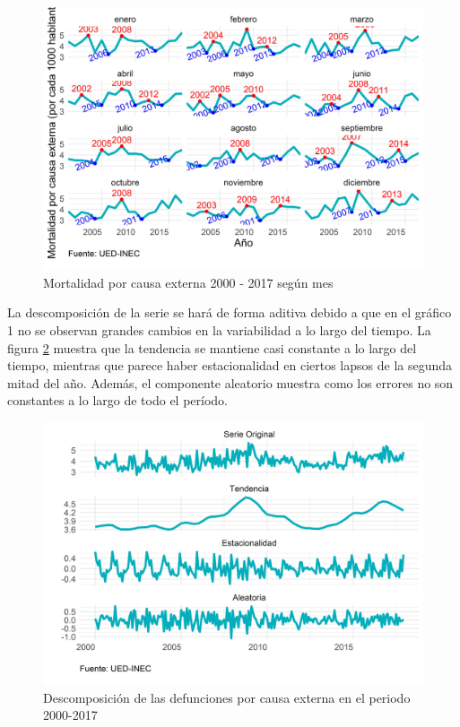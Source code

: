 \documentclass[
]{article}
\begin{document}
\begin{figure}[!h]
\includegraphics[width=1\linewidth,height=1\textheight]{Tesis_files/figure-latex/externasplotperiodos-1} \caption{Mortalidad por causa externa 2000 - 2017 según mes}\label{fig:externasplotperiodos}
\end{figure}

La descomposición de la serie se hará de forma aditiva debido a que en
el gráfico 1 no se observan grandes cambios en la variabilidad a lo
largo del tiempo. La figura \ref{fig:externasplotdescomposicion} muestra
que la tendencia se mantiene casi constante a lo largo del tiempo,
mientras que parece haber estacionalidad en ciertos lapsos de la segunda
mitad del año. Además, el componente aleatorio muestra como los errores
no son constantes a lo largo de todo el período.

\begin{figure}[!h]
\includegraphics[width=1\linewidth,height=1\textheight]{Tesis_files/figure-latex/externasplotdescomposicion-1} \caption{Descomposición de las defunciones por causa externa en el periodo 2000-2017}\label{fig:externasplotdescomposicion}
\end{figure}
\end{document}
